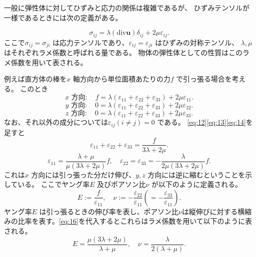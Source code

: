 \documentclass[dvipdfmx]{jsreport}
\numberwithin{equation}{chapter}
\numberwithin{table}{chapter}
\begin{document}
一般に弾性体に対してひずみと応力の関係は複雑であるが、
ひずみテンソルが一様であるときには次の定義がある。

\begin{equation}
\label{eq:11}
	\sigma_{ij}=\lambda (\mathrm{div}\bm{u})\delta_{ij}+2\mu \varepsilon_{ij}
.\end{equation}
ここで$\sigma_{ij}=\sigma_{ji}$ は応力テンソルであり、$\varepsilon_{ij}=\varepsilon_{ji}$ はひずみの対称テンソル、
$\lambda,\mu$ はそれぞれラメ係数と呼ばれる量である。
物体の弾性体としての性質はこのラメ係数を用いて表される。

例えば直方体の棒を$x$ 軸方向から単位面積あたりの力$f$ で引っ張る場合を考える。
このとき
\begin{equation}
\label{eq:12}
	\text{$x$ 方向}:\quad f=\lambda(\varepsilon_{11}+\varepsilon_{22}+\varepsilon_{33})+2\mu \varepsilon_{11}
.\end{equation}
\begin{equation}
\label{eq:13}
	\text{$y$ 方向}:\quad 0=\lambda(\varepsilon_{11}+\varepsilon_{22}+\varepsilon_{33})+2\mu \varepsilon_{22}
.\end{equation}
\begin{equation}
\label{eq:14}
	\text{$z$ 方向}:\quad 0=\lambda(\varepsilon_{11}+\varepsilon_{22}+\varepsilon_{33})+2\mu \varepsilon_{33}
.\end{equation}
なお、それ以外の成分については$\varepsilon_{ij}(i\neq j)=0$ である。
\eqref{eq:12}\eqref{eq:13}\eqref{eq:14}を足すと
\begin{equation}
\label{eq:15}
	\varepsilon_{11}+\varepsilon_{22}+\varepsilon_{33}=\frac{f}{3\lambda+2\mu}
.\end{equation}
\begin{equation}
\label{eq:16}
	\varepsilon_{11}=\frac{\lambda+\mu}{\mu(3\lambda+2\mu)}f,\quad \varepsilon_{22}=\varepsilon_{33}=-\frac{\lambda}{2\mu(3\lambda+2\mu)}f
.\end{equation}
これは$x$ 方向には引っ張った分だけ伸び、$y,z$ 方向には逆に縮むということを示している。
ここでヤング率$E$ 及びポアソン比$\nu$ が以下のように定義される。
\begin{equation}
\label{eq:17}
	E:=\frac{f}{\varepsilon_{11}},\quad \nu:=-\frac{\varepsilon_{22}}{\varepsilon_{11}}\left( =-\frac{\varepsilon_{33}}{\varepsilon_{11}} \right) 
.\end{equation}
ヤング率$E$ は引っ張るときの伸び率を表し、ポアソン比$\nu$は縦伸びに対する横縮みの比率を表す。\eqref{eq:16}を代入するとこれらはラメ係数を用いて以下のように表される。
\begin{equation}
\label{eq:18}
	E=\frac{\mu(3\lambda+2\mu)}{\lambda+\mu},\quad \nu=\frac{\lambda}{2(\lambda+\mu)}
.\end{equation}
\end{document}
